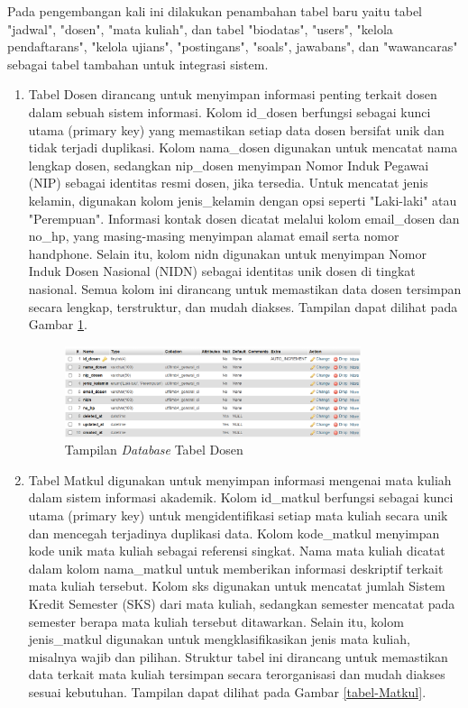 Pada pengembangan kali ini dilakukan penambahan tabel baru yaitu tabel "jadwal", "dosen", "mata kuliah", dan tabel  "biodatas", "users", "kelola pendaftarans", "kelola ujians", "postingans", "soals", jawabans", dan "wawancaras" sebagai tabel tambahan untuk integrasi sistem.

\begin{enumerate}

	\item Tabel Dosen dirancang untuk menyimpan informasi penting terkait dosen dalam sebuah sistem informasi. Kolom id\_dosen berfungsi sebagai kunci utama (primary key) yang memastikan setiap data dosen bersifat unik dan tidak terjadi duplikasi. Kolom nama\_dosen digunakan untuk mencatat nama lengkap dosen, sedangkan nip\_dosen menyimpan Nomor Induk Pegawai (NIP) sebagai identitas resmi dosen, jika tersedia. Untuk mencatat jenis kelamin, digunakan kolom jenis\_kelamin dengan opsi seperti "Laki-laki" atau "Perempuan". Informasi kontak dosen dicatat melalui kolom email\_dosen dan no\_hp, yang masing-masing menyimpan alamat email serta nomor handphone. Selain itu, kolom nidn digunakan untuk menyimpan Nomor Induk Dosen Nasional (NIDN) sebagai identitas unik dosen di tingkat nasional. Semua kolom ini dirancang untuk memastikan data dosen tersimpan secara lengkap, terstruktur, dan mudah diakses. Tampilan dapat dilihat pada Gambar \ref{tabel-Dosen}.

	      \begin{figure}
		      \centering
		      \includegraphics[width=0.82\textwidth]{konten/gambar/implementasi/tabel-dosen.png}
		      \caption{Tampilan \textit{Database} Tabel Dosen}
		      \label{tabel-Dosen}
	      \end{figure}


	\item Tabel Matkul digunakan untuk menyimpan informasi mengenai mata kuliah dalam sistem informasi akademik. Kolom id\_matkul berfungsi sebagai kunci utama (primary key) untuk mengidentifikasi setiap mata kuliah secara unik dan mencegah terjadinya duplikasi data. Kolom kode\_matkul menyimpan kode unik mata kuliah sebagai referensi singkat. Nama mata kuliah dicatat dalam kolom nama\_matkul untuk memberikan informasi deskriptif terkait mata kuliah tersebut. Kolom sks digunakan untuk mencatat jumlah Sistem Kredit Semester (SKS) dari mata kuliah, sedangkan semester mencatat pada semester berapa mata kuliah tersebut ditawarkan. Selain itu, kolom jenis\_matkul digunakan untuk mengklasifikasikan jenis mata kuliah, misalnya wajib dan pilihan. Struktur tabel ini dirancang untuk memastikan data terkait mata kuliah tersimpan secara terorganisasi dan mudah diakses sesuai kebutuhan. Tampilan dapat dilihat pada Gambar \ref{tabel-Matkul}.


\end{enumerate}
